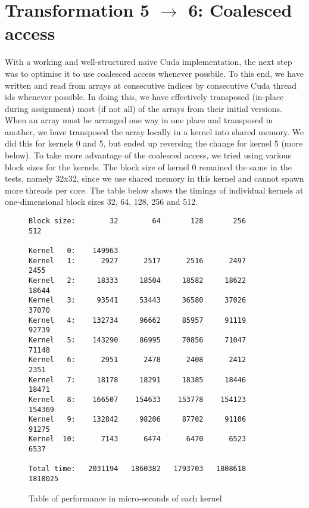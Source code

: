 \section{Transformation 5 $\rightarrow$ 6: Coalesced access}

With a working and well-structured naive Cuda implementation, the next step was to optimise it to use coalesced access whenever possbile. To this end, we have written and read from arrays at consecutive indices by consecutive Cuda thread ids whenever possible. In doing this, we have effectively transposed (in-place during assignment) most (if not all) of the arrays from their initial versions.\n
When an array must be arranged one way in one place and transposed in another, we have transposed the array locally in a kernel into shared memory. We did this for kernels 0 and 5, but ended up reversing the change for kernel 5 (more below).\n
To take more advantage of the coalesced access, we tried using various block sizes for the kernels. The block size of kernel 0 remained the same in the tests, namely 32x32, since we use shared memory in this kernel and cannot spawn more threads per core. The table below shows the timings of individual kernels at one-dimensional block sizes 32, 64, 128, 256 and 512.


\begin{figure}[H]
    \centering
\begin{Verbatim}[label={Running time for individual kernels}]
Block size:        32        64       128       256       512

Kernel   0:    149963
Kernel   1:      2927      2517      2516      2497      2455
Kernel   2:     18333     18504     18582     18622     18644
Kernel   3:     93541     53443     36580     37026     37070
Kernel   4:    132734     96662     85957     91119     92739
Kernel   5:    143290     86995     70856     71047     71148
Kernel   6:      2951      2478      2408      2412      2351
Kernel   7:     18178     18291     18385     18446     18471
Kernel   8:    166507    154633    153778    154123    154369
Kernel   9:    132842     98206     87702     91106     91275
Kernel  10:      7143      6474      6470      6523      6537

Total time:   2031194   1860382   1793703   1808618   1818025
\end{Verbatim}
\caption{Table of performance in micro-seconds of each kernel}
\end{figure}

